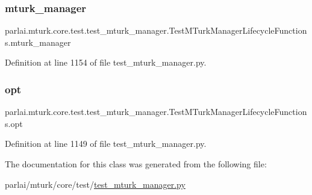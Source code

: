 \subsubsection{\texorpdfstring{mturk\+\_\+manager}{mturk\_manager}}
{\footnotesize\ttfamily parlai.\+mturk.\+core.\+test.\+test\+\_\+mturk\+\_\+manager.\+Test\+M\+Turk\+Manager\+Lifecycle\+Functions.\+mturk\+\_\+manager}



Definition at line 1154 of file test\+\_\+mturk\+\_\+manager.\+py.

\mbox{\label{classparlai_1_1mturk_1_1core_1_1test_1_1test__mturk__manager_1_1TestMTurkManagerLifecycleFunctions_a235dd6261d7d4a9342bf418720167070}} 
\subsubsection{\texorpdfstring{opt}{opt}}
{\footnotesize\ttfamily parlai.\+mturk.\+core.\+test.\+test\+\_\+mturk\+\_\+manager.\+Test\+M\+Turk\+Manager\+Lifecycle\+Functions.\+opt}



Definition at line 1149 of file test\+\_\+mturk\+\_\+manager.\+py.



The documentation for this class was generated from the following file\+:\begin{DoxyCompactItemize}
\item 
parlai/mturk/core/test/\hyperlink{test_2test__mturk__manager_8py}{test\+\_\+mturk\+\_\+manager.\+py}\end{DoxyCompactItemize}
